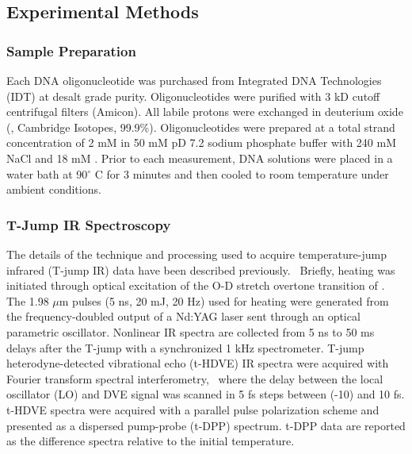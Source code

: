 \documentclass[journal=jpcbfk,manuscript=article]{achemso}
\begin{document}

\subsection{Experimental Methods}

\subsubsection{Sample Preparation}

Each DNA oligonucleotide was purchased from Integrated DNA Technologies (IDT) at desalt grade purity. Oligonucleotides were purified with 3 kD cutoff centrifugal filters (Amicon). All labile protons were exchanged in deuterium oxide (, Cambridge Isotopes, 99.9\%). Oligonucleotides were prepared at a total strand concentration of 2 mM in 50 mM pD 7.2 sodium phosphate buffer with 240 mM NaCl and 18 mM . Prior to each measurement, DNA solutions were placed in a water bath at 90$^{\circ}$ C for 3 minutes and then cooled to room temperature under ambient conditions.

\subsubsection{T-Jump IR Spectroscopy}\label{sec:Tjump}

The details of the technique and processing used to acquire temperature-jump infrared (T-jump IR) data have been described previously.~\citep{Chung2007TransientKinetics,Jones2009Heterodyne-detectedSpectroscopy,Jones2012TransientInfrared} Briefly, heating was initiated through optical excitation of the O-D stretch overtone transition of . The 1.98 $\mu$m pulses (5 ns, 20 mJ, 20 Hz) used for heating were generated from the frequency-doubled output of a Nd:YAG laser sent through an optical parametric oscillator. Nonlinear IR spectra are collected from 5 ns to 50 ms delays after the T-jump with a synchronized 1 kHz spectrometer. T-jump heterodyne-detected vibrational echo (t-HDVE) IR spectra were acquired with Fourier transform spectral interferometry,~\citep{Jones2009Heterodyne-detectedSpectroscopy} where the delay between the local oscillator (LO) and DVE signal was scanned in 5 fs steps between (-10) and 10 fs. t-HDVE spectra were acquired with a parallel pulse polarization scheme and presented as a dispersed pump-probe (t-DPP) spectrum. t-DPP data are reported as the difference spectra relative to the initial temperature. 
\end{document}
